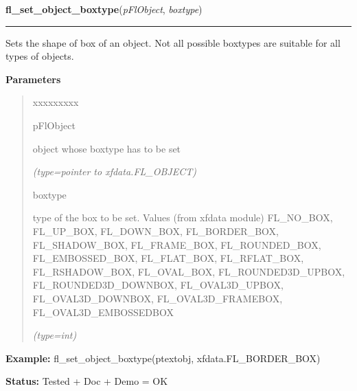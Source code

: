 \hspace{.8\funcindent}\begin{boxedminipage}{\funcwidth}

    \raggedright \textbf{fl\_set\_object\_boxtype}(\textit{pFlObject}, \textit{boxtype})

    \vspace{-1.5ex}

    \rule{\textwidth}{0.5\fboxrule}
\setlength{\parskip}{2ex}
    Sets the shape of box of an object. Not all possible boxtypes are 
    suitable for all types of objects.

\setlength{\parskip}{1ex}
      \textbf{Parameters}
      \vspace{-1ex}

      \begin{quote}
        \begin{Ventry}{xxxxxxxxx}

          \item[pFlObject]

          object whose boxtype has to be set

            {\it (type=pointer to xfdata.FL\_OBJECT)}

          \item[boxtype]

          type of the box to be set. Values (from xfdata module) 
          FL\_NO\_BOX, FL\_UP\_BOX, FL\_DOWN\_BOX, FL\_BORDER\_BOX, 
          FL\_SHADOW\_BOX, FL\_FRAME\_BOX, FL\_ROUNDED\_BOX, 
          FL\_EMBOSSED\_BOX, FL\_FLAT\_BOX, FL\_RFLAT\_BOX, 
          FL\_RSHADOW\_BOX, FL\_OVAL\_BOX, FL\_ROUNDED3D\_UPBOX, 
          FL\_ROUNDED3D\_DOWNBOX, FL\_OVAL3D\_UPBOX, FL\_OVAL3D\_DOWNBOX, 
          FL\_OVAL3D\_FRAMEBOX, FL\_OVAL3D\_EMBOSSEDBOX

            {\it (type=int)}

        \end{Ventry}

      \end{quote}

\textbf{Example:} fl\_set\_object\_boxtype(ptextobj, xfdata.FL\_BORDER\_BOX)



\textbf{Status:} Tested + Doc + Demo = OK



    \end{boxedminipage}

    \label{xformslib:flbasic:fl_get_object_boxtype}

